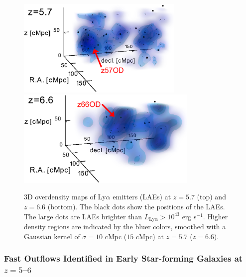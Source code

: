 \begin{figure}
\begin{center}
\includegraphics[height=4.7cm]{astrodiv/cos/Harikane2019_Fig3a.eps} 
\includegraphics[height=4.7cm]{astrodiv/cos/Harikane2019_Fig3b.eps} 
\end{center}
\vspace{-5mm}
\caption{
3D overdensity maps of Ly$\alpha$ emitters (LAEs) at $z=5.7$ (top) and $z=6.6$ (bottom).
The black dots show the positions of the LAEs.
The large dots are LAEs brighter than $L_\mathrm{Ly\alpha}>10^{43}$ erg s$^{-1}$.
Higher density regions are indicated by the bluer colors, 
smoothed with a Gaussian kernel of $\sigma=10$ cMpc ($15$ cMpc) at $z=5.7$ ($z=6.6$).
}
\label{cos:Harikane2019_Fig3}
\end{figure}







\subsubsection*{\bi
Fast Outflows Identified in Early Star-forming Galaxies at $z = 5$--$6$
{\rm \cite{sugahara2019}}
}

\vspace{3pt}


